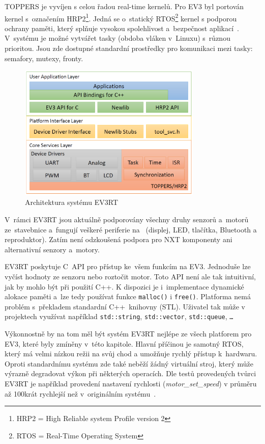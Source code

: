 TOPPERS je vyvíjen s celou řadou real-time kernelů. Pro EV3 byl portován kernel s~označením HRP2\footnote{HRP2 = High Reliable system Profile version 2}.
Jedná se o~statický RTOS\footnote{RTOS = Real-Time Operating System} kernel s podporou ochrany paměti, který splňuje vysokou spolehlivost a~bezpečnost aplikací~\cite{legoProgramingPlatform_EV3RT-paper}.
V~systému je možné vytvářet tasky (obdoba vláken v~Linuxu) s~různou prioritou. 
Jsou zde dostupné standardní prostředky pro komunikaci mezi tasky: semafory, mutexy, fronty.

\begin{figure}[h]
	\centering
	\includegraphics[width=330px]{images/ev3rt-architecture.png}
	\caption[Architektura systému EV3RT]{Architektura systému EV3RT\protect\footnotemark}
	\label{ev3rt-architecture}
\end{figure}


V~rámci EV3RT jsou aktuálně podporovány všechny druhy senzorů a~motorů ze~stavebnice \legoEV{} a~fungují veškeré periferie na~ (displej, LED, tlačítka, Bluetooth a reproduktor). 
Zatím není odzkoušená podpora pro NXT komponenty ani alternativní senzory a~motory. 

EV3RT poskytuje C~API pro přístup ke~všem funkcím na EV3. 
Jednoduše lze vyčíst hodnoty ze senzoru nebo roztočit motor.
Toto API není ale tak intuitivní, jak by mohlo být při použití C++.
K dispozici je i~implementace dynamické alokace paměti a~lze tedy používat funkce \verb|malloc()| i \verb|free()|.
Platforma nemá problém s~překladem standardní C++~knihovny (STL).
Uživatel tak může v projektech využívat například \texttt{std::string}, \texttt{std::vector}, \texttt{std::queue}, \texttt{\dots}

Výkonnostně by na tom měl být systém EV3RT nejlépe ze všech platforem pro EV3, které byly zmíněny v~této kapitole. 
Hlavní příčinou je samotný RTOS, který má velmi nízkou režii na svůj chod a umožňuje rychlý přístup k~hardwaru. %
Oproti standardnímu \lego{} systému zde také neběží žádný virtuální stroj, který může výrazně degradovat výkon při některých operacích. 
Dle testů provedených tvůrci EV3RT je například provedení nastavení rychlosti ({\it motor\_set\_speed}) v průměru až 100krát
 rychlejší než v~originálním systému~\cite{legoProgramingPlatform_EV3RT-paper}. \\
 
